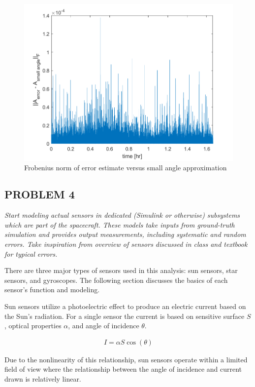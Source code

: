 \begin{figure}[H]
\centering
\includegraphics[scale=0.6]{Images/ps7_problem3.png}
\caption{Frobenius norm of error estimate versus small angle approximation}
\label{fig:ps7_problem3}
\end{figure}

\subsection{PROBLEM 4}
\textit{Start modeling actual sensors in dedicated (Simulink or otherwise) subsystems which are part of the spacecraft. These models take inputs from ground-truth simulation and provides output measurements, including systematic and random errors. Take inspiration from overview of sensors discussed in class and textbook for typical errors.}

There are three major types of sensors used in this analysis: sun sensors, star sensors, and gyroscopes. The following section discusses the basics of each sensor's function and modeling.

Sun sensors utilize a photoelectric effect to produce an electric current based on the Sun's radiation. For a single sensor the current is based on sensitive surface $S$, optical properties $\alpha$, and angle of incidence $\theta$.

\begin{align*}
    I = \alpha S \cos(\theta)
\end{align*}

Due to the nonlinearity of this relationship, sun sensors operate within a limited field of view where the relationship between the angle of incidence and current drawn is relatively linear.

